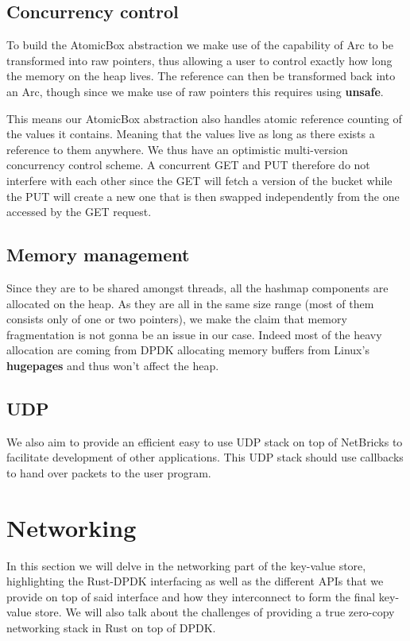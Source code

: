 \documentclass[11pt]{article}
\begin{document}
\subsection{Concurrency control}

To build the AtomicBox abstraction we make use of the capability of
Arc to be transformed into raw pointers, thus allowing a user to
control exactly how long the memory on the heap lives. The reference
can then be transformed back into an Arc, though since we make use of
raw pointers this requires using \textbf{unsafe}.

This means our AtomicBox abstraction also handles atomic reference
counting of the values it contains. Meaning that the values live as
long as there exists a reference to them anywhere. We thus have an
optimistic multi-version concurrency control scheme. A concurrent GET
and PUT therefore do not interfere with each other since the GET will
fetch a version of the bucket while the PUT will create a new one that
is then swapped independently from the one accessed by the GET
request.

\subsection{Memory management}

Since they are to be shared amongst threads, all the hashmap
components are allocated on the heap. As they are  all in the same
size range (most of them consists only of one or two pointers), we
make the claim that memory fragmentation is not gonna be an issue in
our case. Indeed most of the heavy allocation are coming from DPDK
allocating memory buffers from Linux's \textbf{hugepages} and thus
won't affect the heap.

\subsection{UDP}

We also aim to provide an efficient easy to use UDP stack on top of
NetBricks to facilitate development of other applications. This UDP
stack should use callbacks to hand over packets to the user program.

\section{Networking}

In this section we will delve in the networking part of the key-value
store, highlighting the Rust-DPDK interfacing as well as the different
APIs that we provide on top of said interface and how they
interconnect to form the final key-value store. We will also talk
about the challenges of providing a true zero-copy networking stack in
Rust on top of DPDK.
\end{document}
